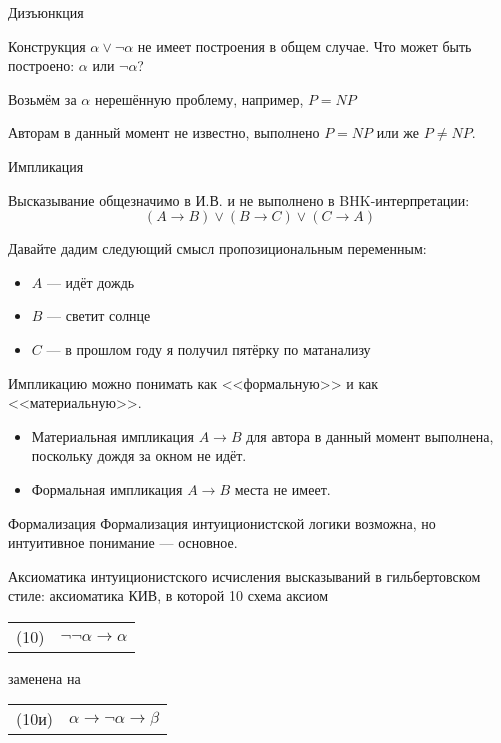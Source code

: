 \documentclass[aspectratio=169]{beamer}
\begin{document}
\begin{frame}{Дизъюнкция}

Конструкция $\alpha\vee\neg\alpha$ не имеет построения в общем случае.
Что может быть построено: $\alpha$ или $\neg\alpha$?\pause

\vspace{1cm}

Возьмём за $\alpha$ нерешённую проблему, например, $P = NP$\pause
\vspace{1cm}

Авторам в данный момент не известно, выполнено $P = NP$ или же $P \ne NP$.
\end{frame}

\begin{frame}{Импликация}

Высказывание общезначимо в И.В. и не выполнено в BHK-интерпретации:
$$(A \rightarrow B) \vee (B \rightarrow C) \vee (C \rightarrow A)$$\pause

Давайте дадим следующий смысл пропозициональным переменным:
\begin{itemize}
\item $A$ --- идёт дождь
\item $B$ --- светит солнце
\item $C$ --- в прошлом году я получил пятёрку по матанализу
\end{itemize}\pause

Импликацию можно понимать как <<формальную>> и как <<материальную>>.
\begin{itemize}
\item Материальная импликация $A\rightarrow B$ для автора в данный момент
выполнена, поскольку дождя за окном не идёт.\pause

\item Формальная импликация $A\rightarrow B$ места не имеет.
\end{itemize}

\end{frame}

\begin{frame}{Формализация}
Формализация интуиционистской логики возможна, но интуитивное понимание --- основное.

\begin{defrus}Аксиоматика интуиционистского исчисления высказываний в гильбертовском стиле: 
аксиоматика КИВ, в которой 10 схема аксиом

\begin{center}\begin{tabular}{ll}
(10) & $\neg \neg \alpha \rightarrow \alpha$
\end{tabular}\end{center}

заменена на 

\begin{center}\begin{tabular}{ll}
(10и) & $\alpha \rightarrow \neg\alpha \rightarrow \beta$
\end{tabular}\end{center}
\end{defrus}
\end{frame}
\end{document}

